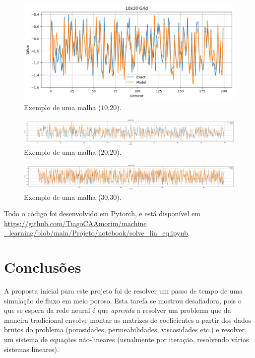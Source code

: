 \documentclass[final,5p]{elsarticle}
\numberwithin{equation}{section}
\begin{document}
    \begin{figure}[hbt!]
        \centering
        \includegraphics[width=0.85\columnwidth]{./fig/10x20.png}
        \caption{Exemplo de uma malha ($10$,$20$).}\label{fig:10x20}
    \end{figure}

    \begin{figure}[hbt!]
        \centering
        \includegraphics[width=0.95\columnwidth]{./fig/20x20.png}
        \caption{Exemplo de uma malha ($20$,$20$).}\label{fig:20x20}
    \end{figure}

    \begin{figure}[hbt!]
        \centering
        \includegraphics[width=0.95\columnwidth]{./fig/30x30.png}
        \caption{Exemplo de uma malha ($30$,$30$).}\label{fig:30x30}
    \end{figure}


    Todo o código foi desenvolvido em Pytorch, e está disponível em \href{https://github.com/TiagoCAAmorim/machine\_learning/blob/main/Projeto/notebook/solve_lin_eq.ipynb}{https://github.com/TiagoCAAmorim/machine \_learning/blob/main/Projeto/notebook/solve\_lin\_eq.ipynb}.


\section{Conclusões}

    A proposta inicial para este projeto foi de resolver um passo de tempo de uma simulação de fluxo em meio poroso. Esta tarefa se mostrou desafiadora, pois o que se espera da rede neural é que \emph{aprenda} a resolver um problema que da maneira tradicional envolve montar as matrizes de coeficientes a partir dos dados brutos do problema (porosidades, permeabilidades, viscosidades etc.) e resolver um sistema de equações não-lineares (usualmente por iteração, resolvendo vários sistemas lineares).
\end{document}
